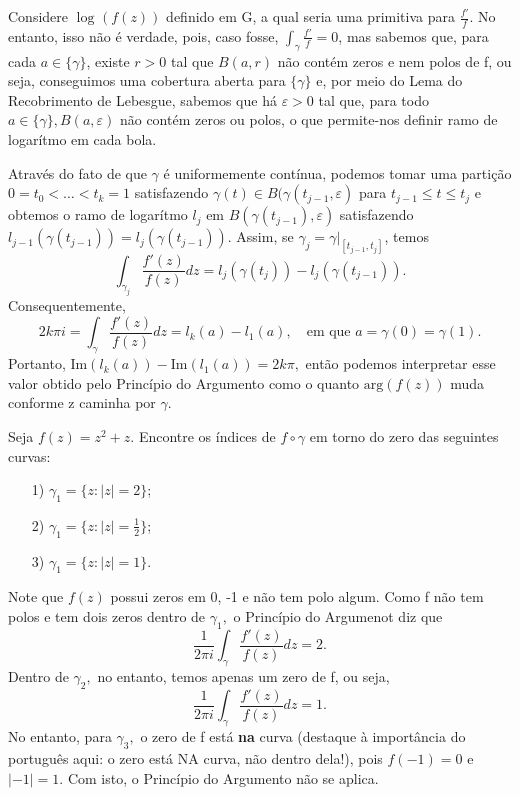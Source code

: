 \documentclass[complex.tex]{subfiles}
\begin{document}
\begin{example}
	Considere \(\log^{}{(f(z))}\) definido em G, a qual seria uma primitiva para \(\frac{f'}{f}.\) No entanto, isso não é verdade, pois, caso fosse,
	\(\int_{\gamma }^{}\frac{f'}{f} = 0\), mas sabemos que, para cada \(a\in\{\gamma \}\), existe \(r > 0\) tal que \(B(a, r)\) não contém zeros e nem polos de f, ou seja,
	conseguimos uma cobertura aberta para \(\{\gamma \}\) e, por meio do Lema do Recobrimento de Lebesgue,\footnotemark[1] sabemos que há \(\varepsilon > 0\) tal que, para todo \(a\in\{\gamma \}, B(a, \varepsilon )\) não
	contém zeros ou polos, o que permite-nos definir ramo de logarítmo em cada bola.

	Através do fato de que \(\gamma \) é uniformemente contínua, podemos tomar uma partição \(0 = t_{0} < \dotsc < t_{k} = 1\) satisfazendo \(\gamma (t)\in B(\gamma (t_{j-1}, \varepsilon )\) para \(t_{j-1}\leq t\leq t_{j}\) e obtemos o ramo de logarítmo
	\(l_{j}\) em \(B(\gamma (t_{j-1}), \varepsilon )\) satisfazendo \(l_{j-1}(\gamma (t_{j-1})) = l_{j}(\gamma (t_{j-1}))\). Assim, se \(\gamma_{j} = \gamma|_[t_{j-1}, t_{j}]\), temos
	\[
		\int_{\gamma_{j}}^{}\frac{f'(z)}{f(z)}dz = l_{j}(\gamma(t_{j})) - l_{j}(\gamma(t_{j-1})).
	\]
	Consequentemente,
	\[
		2k\pi i = \int_{\gamma }^{}\frac{f'(z)}{f(z)}dz = l_{k}(a) - l_{1}(a),\quad \text{em que }a=\gamma (0)=\gamma (1).
	\]
	Portanto, \(\mathrm{Im}(l_{k}(a)) - \mathrm{Im}(l_{1}(a)) = 2k\pi ,\) então podemos interpretar esse valor obtido pelo Princípio do Argumento como o quanto \(\mathrm{arg}(f(z))\) muda
	conforme z caminha por \(\gamma .\)
\end{example}
\begin{example}
	Seja \(f(z) = z^{2} + z.\) Encontre os índices de \(f\circ \gamma \) em torno do zero das seguintes curvas:
	\begin{itemize}
		\item[1)] \(\gamma_{1} = \{z: |z| = 2\}\);
		\item[2)] \(\gamma_{1} = \{z: |z| = \frac{1}{2}\}\);
		\item[3)] \(\gamma_{1} = \{z: |z| = 1\}\).
	\end{itemize}
	Note que \(f(z)\) possui zeros em 0, -1 e não tem polo algum. Como f não tem polos e tem dois zeros dentro de \(\gamma_{1},\) o Princípio do Argumenot
	diz que
	\[
		\frac{1}{2\pi i}\int_{\gamma }^{}\frac{f'(z)}{f(z)}dz = 2.
	\]
	Dentro de \(\gamma_{2},\) no entanto, temos apenas um zero de f, ou seja,
	\[
		\frac{1}{2\pi i}\int_{\gamma }^{}\frac{f'(z)}{f(z)}dz = 1.
	\]
	No entanto, para \(\gamma_{3},\) o zero de f está \textbf{na} curva (destaque à importância do português aqui: o zero está NA curva, não dentro dela!), pois \(f(-1) = 0\) e \(|-1| = 1.\) Com isto, o Princípio do Argumento
	não se aplica.
\end{example}
\end{document}
